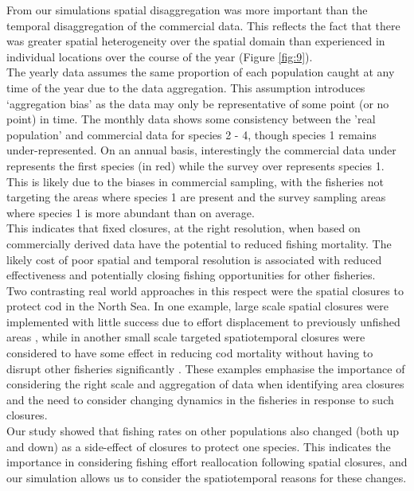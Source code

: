 \documentclass[review]{elsarticle}
\begin{document}
From our simulations spatial disaggregation was more important than the
temporal disaggregation of the commercial data. This reflects the fact that
there was greater spatial heterogeneity over the spatial domain than
experienced in individual locations over the course of the year (Figure
\ref{fig:9}). \\ 

The yearly data assumes the same proportion of each population caught at any
time of the year due to the data aggregation. This assumption introduces
`aggregation bias' as the data may only be representative of some point (or no
point) in time. The monthly data shows some consistency between the 'real population' and
commercial data for species 2 - 4, though species 1 remains under-represented.
On an annual basis, interestingly the commercial data under represents the
first species (in red) while the survey over represents species 1. This is
likely due to the biases in commercial sampling, with the fisheries not
targeting the areas where species 1 are present and the survey sampling areas
where species 1 is more abundant than on average. \\

This indicates that fixed closures, at the right resolution, when based on
commercially derived data have the potential to reduced fishing mortality. The
likely cost of poor spatial and temporal resolution is associated with reduced
effectiveness and potentially closing fishing opportunities for other
fisheries. \\

Two contrasting real world approaches in this respect were the spatial closures
to protect cod in the North Sea. In one example, large scale spatial closures
were implemented with little success due to effort displacement to previously
unfished areas \citep{Dinmore2003}, while in another small scale targeted
spatiotemporal closures were considered to have some effect in reducing cod
mortality without having to disrupt other fisheries significantly
\citep{Needle2011}. These examples emphasise the importance of considering the
right scale and aggregation of data when identifying area closures and the need
to consider changing dynamics in the fisheries in response to such closures. \\

Our study showed that fishing rates on other populations also changed (both up
and down) as a side-effect of closures to protect one species.  This indicates
the importance in considering fishing effort reallocation following spatial
closures, and our simulation allows us to consider the spatiotemporal reasons
for these changes.
\end{document}
